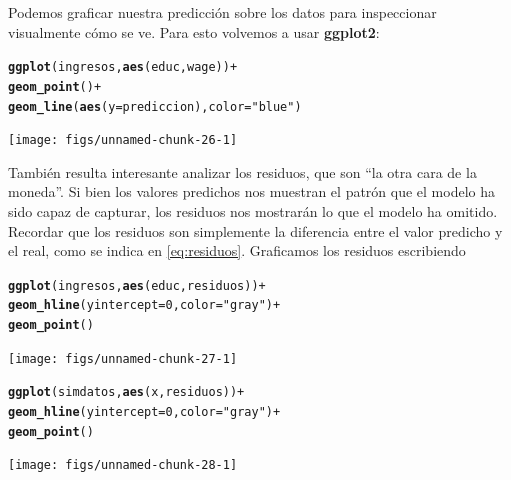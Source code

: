 \documentclass{report}\usepackage[]{graphicx}\usepackage[]{color}
\makeatletter
\newcommand{\hlnum}[1]{\textcolor[rgb]{0.686,0.059,0.569}{#1}}%
\newcommand{\hlstr}[1]{\textcolor[rgb]{0.192,0.494,0.8}{#1}}%
\newcommand{\hlopt}[1]{\textcolor[rgb]{0,0,0}{#1}}%
\newcommand{\hlstd}[1]{\textcolor[rgb]{0.345,0.345,0.345}{#1}}%
\newcommand{\hlkwc}[1]{\textcolor[rgb]{0.333,0.667,0.333}{#1}}%
\newcommand{\hlkwd}[1]{\textcolor[rgb]{0.737,0.353,0.396}{\textbf{#1}}}%
\newenvironment{kframe}{%
 \def\at@end@of@kframe{}%
 \ifinner\ifhmode%
  \def\at@end@of@kframe{\end{minipage}}%
  \begin{minipage}{\columnwidth}%
 \fi\fi%
 \def\FrameCommand##1{\hskip\@totalleftmargin \hskip-\fboxsep
 \colorbox{shadecolor}{##1}\hskip-\fboxsep
     \hskip-\linewidth \hskip-\@totalleftmargin \hskip\columnwidth}%
 \MakeFramed {\advance\hsize-\width
   \@totalleftmargin\z@ \linewidth\hsize
   \@setminipage}}%
 {\par\unskip\endMakeFramed%
 \at@end@of@kframe}
\newenvironment{knitrout}{}{} %
\newcommand*{\paq}[1]{\textbf{#1}\index{#1@\textbf{#1}}}
\makeatother
\begin{document}
Podemos graficar nuestra predicción sobre los datos para inspeccionar visualmente cómo se ve. Para esto volvemos a usar \paq{ggplot2}:
\begin{knitrout}
\color{fgcolor}\begin{kframe}
\begin{alltt}
\hlkwd{ggplot}\hlstd{(ingresos,} \hlkwd{aes}\hlstd{(educ, wage))} \hlopt{+}
  \hlkwd{geom_point}\hlstd{()} \hlopt{+}
  \hlkwd{geom_line}\hlstd{(}\hlkwd{aes}\hlstd{(}\hlkwc{y} \hlstd{= prediccion),} \hlkwc{color} \hlstd{=} \hlstr{"blue"}\hlstd{)}
\end{alltt}
\end{kframe}

{\centering \texttt{[image: figs/unnamed-chunk-26-1]} 

}



\end{knitrout}

También resulta interesante analizar los residuos, que son ``la otra cara de la moneda''. Si bien los valores predichos nos muestran el patrón que el modelo ha sido capaz de capturar, los residuos nos mostrarán lo que el modelo ha omitido. Recordar que los residuos son simplemente la diferencia entre el valor predicho y el real, como se indica en \eqref{eq:residuos}. Graficamos los residuos escribiendo

\begin{knitrout}
\color{fgcolor}\begin{kframe}
\begin{alltt}
\hlkwd{ggplot}\hlstd{(ingresos,} \hlkwd{aes}\hlstd{(educ, residuos))} \hlopt{+}
  \hlkwd{geom_hline}\hlstd{(}\hlkwc{yintercept} \hlstd{=} \hlnum{0}\hlstd{,} \hlkwc{color} \hlstd{=} \hlstr{"gray"}\hlstd{)} \hlopt{+}
  \hlkwd{geom_point}\hlstd{()}
\end{alltt}
\end{kframe}

{\centering \texttt{[image: figs/unnamed-chunk-27-1]} 

}



\end{knitrout}

\begin{knitrout}
\color{fgcolor}\begin{kframe}
\begin{alltt}
\hlkwd{ggplot}\hlstd{(simdatos,} \hlkwd{aes}\hlstd{(x, residuos))} \hlopt{+}
  \hlkwd{geom_hline}\hlstd{(}\hlkwc{yintercept} \hlstd{=} \hlnum{0}\hlstd{,} \hlkwc{color} \hlstd{=} \hlstr{"gray"}\hlstd{)} \hlopt{+}
  \hlkwd{geom_point}\hlstd{()}
\end{alltt}
\end{kframe}

{\centering \texttt{[image: figs/unnamed-chunk-28-1]} 

}



\end{knitrout}
\end{document}
